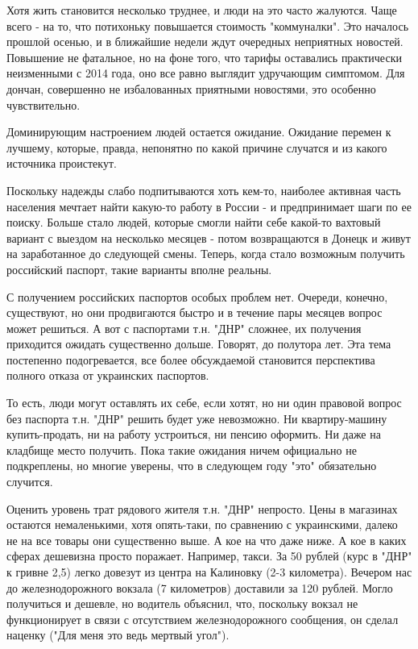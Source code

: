 Хотя жить становится несколько труднее, и люди на это часто жалуются. Чаще
всего - на то, что потихоньку повышается стоимость "коммуналки". Это началось
прошлой осенью, и в ближайшие недели ждут очередных неприятных новостей.
Повышение не фатальное, но на фоне того, что тарифы оставались практически
неизменными с 2014 года, оно все равно выглядит удручающим симптомом. Для
дончан, совершенно не избалованных приятными новостями, это особенно
чувствительно.

Доминирующим настроением людей остается ожидание. Ожидание перемен к лучшему,
которые, правда, непонятно по какой причине случатся и из какого источника
проистекут.

Поскольку надежды слабо подпитываются хоть кем-то, наиболее активная часть
населения мечтает найти какую-то работу в России - и предпринимает шаги по ее
поиску. Больше стало людей, которые смогли найти себе какой-то вахтовый вариант
с выездом на несколько месяцев - потом возвращаются в Донецк и живут на
заработанное до следующей смены. Теперь, когда стало возможным получить
российский паспорт, такие варианты вполне реальны.

С получением российских паспортов особых проблем нет. Очереди, конечно,
существуют, но они продвигаются быстро и в течение пары месяцев вопрос может
решиться. А вот с паспортами т.н. "ДНР" сложнее, их получения приходится
ожидать существенно дольше. Говорят, до полутора лет. Эта тема постепенно
подогревается, все более обсуждаемой становится перспектива полного отказа от
украинских паспортов.

То есть, люди могут оставлять их себе, если хотят, но ни один правовой вопрос
без паспорта т.н. "ДНР" решить будет уже невозможно. Ни квартиру-машину
купить-продать, ни на работу устроиться, ни пенсию оформить. Ни даже на
кладбище место получить. Пока такие ожидания ничем официально не подкреплены,
но многие уверены, что в следующем году "это" обязательно случится.

Оценить уровень трат рядового жителя т.н. "ДНР" непросто. Цены в магазинах
остаются немаленькими, хотя опять-таки, по сравнению с украинскими, далеко не
на все товары они существенно выше. А кое на что даже ниже. А кое в каких
сферах дешевизна просто поражает. Например, такси. За 50 рублей (курс в "ДНР" к
гривне 2,5) легко довезут из центра на Калиновку (2-3 километра). Вечером нас
до железнодорожного вокзала (7 километров) доставили за 120 рублей. Могло
получиться и дешевле, но водитель объяснил, что, поскольку вокзал не
функционирует в связи с отсутствием железнодорожного сообщения, он сделал
наценку ("Для меня это ведь мертвый угол").

